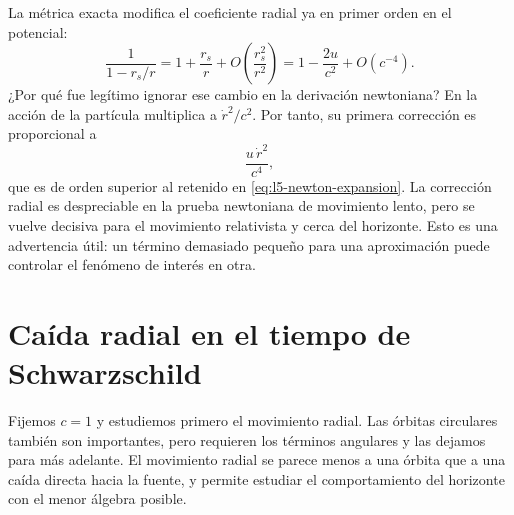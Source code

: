 La métrica exacta modifica el coeficiente radial ya en primer orden en el potencial:
\begin{equation}
\frac{1}{1-r_s/r}
=1+\frac{r_s}{r}
+O\!\left(\frac{r_s^2}{r^2}\right)
=1-\frac{2u}{c^2}+O(c^{-4}).
\label{eq:l5-radial-expansion}
\end{equation}
¿Por qué fue legítimo ignorar ese cambio en la derivación newtoniana? En la acción de la partícula multiplica a \(\dot r^2/c^2\). Por tanto, su primera corrección es proporcional a
\begin{equation}
\frac{u\,\dot r^2}{c^4},
\end{equation}
que es de orden superior al retenido en \eqref{eq:l5-newton-expansion}. La corrección radial es despreciable en la prueba newtoniana de movimiento lento, pero se vuelve decisiva para el movimiento relativista y cerca del horizonte. Esto es una advertencia útil: un término demasiado pequeño para una aproximación puede controlar el fenómeno de interés en otra.

\section{Caída radial en el tiempo de Schwarzschild}

Fijemos \(c=1\) y estudiemos primero el movimiento radial. Las órbitas circulares también son importantes, pero requieren los términos angulares y las dejamos para más adelante. El movimiento radial se parece menos a una órbita que a una caída directa hacia la fuente, y permite estudiar el comportamiento del horizonte con el menor álgebra posible.

\begin{classroomqa}
\end{classroomqa}

